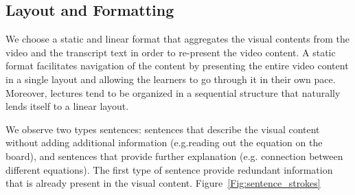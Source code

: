 \subsection{Layout and Formatting}
We choose a static and linear format that aggregates the visual contents from the video and the transcript text in order to re-present the video content. A static format facilitates navigation of the content by presenting the entire video content in a single layout and  allowing the learners to go through it in their own pace. Moreover, lectures tend to be organized in a sequential structure that naturally lends itself to a linear layout. 

We observe two types sentences: sentences that describe the visual content without adding additional information (e.g.reading out the equation on the board), and sentences that provide further explanation (e.g. connection between different equations). The first type of sentence provide redundant information that is already present in the visual content. Figure~\ref{Fig:sentence_strokes} 


